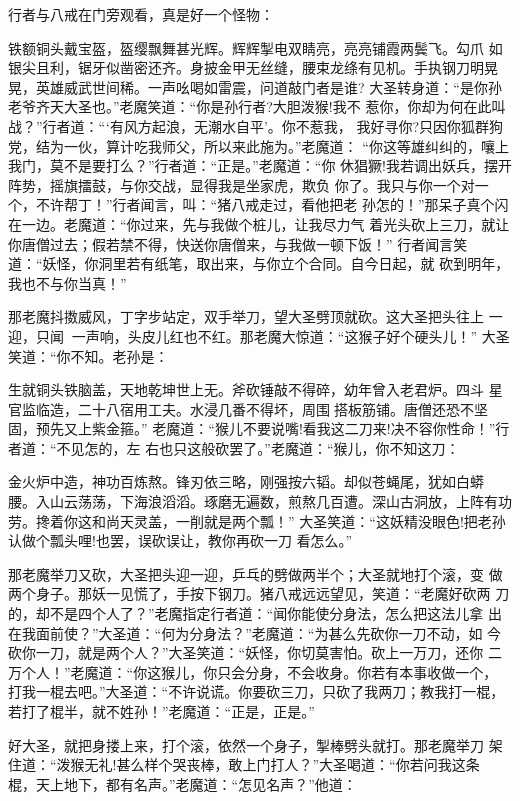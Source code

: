 行者与八戒在门旁观看，真是好一个怪物：

铁额铜头戴宝盔，盔缨飘舞甚光辉。辉辉掣电双睛亮，亮亮铺霞两鬓飞。勾爪
如银尖且利，锯牙似凿密还齐。身披金甲无丝缝，腰束龙绦有见机。手执钢刀明晃
晃，英雄威武世间稀。一声吆喝如雷震，问道敲门者是谁?
大圣转身道：“是你孙老爷齐天大圣也。”老魔笑道：“你是孙行者?大胆泼猴!我不
惹你，你却为何在此叫战？”行者道：“‘有风方起浪，无潮水自平’。你不惹我，
我好寻你?只因你狐群狗党，结为一伙，算计吃我师父，所以来此施为。”老魔道：
“你这等雄纠纠的，嚷上我门，莫不是要打么？”行者道：“正是。”老魔道：“你
休猖獗!我若调出妖兵，摆开阵势，摇旗擂鼓，与你交战，显得我是坐家虎，欺负
你了。我只与你一个对一个，不许帮丁！”行者闻言，叫：“猪八戒走过，看他把老
孙怎的！”那呆子真个闪在一边。老魔道：“你过来，先与我做个桩儿，让我尽力气
着光头砍上三刀，就让你唐僧过去；假若禁不得，快送你唐僧来，与我做一顿下饭！”
行者闻言笑道：“妖怪，你洞里若有纸笔，取出来，与你立个合同。自今日起，就
砍到明年，我也不与你当真！”

那老魔抖擞威风，丁字步站定，双手举刀，望大圣劈顶就砍。这大圣把头往上
一迎，只闻一声响，头皮儿红也不红。那老魔大惊道：“这猴子好个硬头儿！”
大圣笑道：“你不知。老孙是：

生就铜头铁脑盖，天地乾坤世上无。斧砍锤敲不得碎，幼年曾入老君炉。四斗
星官监临造，二十八宿用工夫。水浸几番不得坏，周围搭板筋铺。唐僧还恐不坚
固，预先又上紫金箍。”
老魔道：“猴儿不要说嘴!看我这二刀来!决不容你性命！”行者道：“不见怎的，左
右也只这般砍罢了。”老魔道：“猴儿，你不知这刀：

金火炉中造，神功百炼熬。锋刃依三略，刚强按六韬。却似苍蝇尾，犹如白蟒
腰。入山云荡荡，下海浪滔滔。琢磨无遍数，煎熬几百遭。深山古洞放，上阵有功
劳。搀着你这和尚天灵盖，一削就是两个瓢！”
大圣笑道：“这妖精没眼色!把老孙认做个瓢头哩!也罢，误砍误让，教你再砍一刀
看怎么。”

那老魔举刀又砍，大圣把头迎一迎，乒乓的劈做两半个；大圣就地打个滚，变
做两个身子。那妖一见慌了，手按下钢刀。猪八戒远远望见，笑道：“老魔好砍两
刀的，却不是四个人了？”老魔指定行者道：“闻你能使分身法，怎么把这法儿拿
出在我面前使？”大圣道：“何为分身法？”老魔道：“为甚么先砍你一刀不动，如
今砍你一刀，就是两个人？”大圣笑道：“妖怪，你切莫害怕。砍上一万刀，还你
二万个人！”老魔道：“你这猴儿，你只会分身，不会收身。你若有本事收做一个，
打我一棍去吧。”大圣道：“不许说谎。你要砍三刀，只砍了我两刀；教我打一棍，
若打了棍半，就不姓孙！”老魔道：“正是，正是。”

好大圣，就把身搂上来，打个滚，依然一个身子，掣棒劈头就打。那老魔举刀
架住道：“泼猴无礼!甚么样个哭丧棒，敢上门打人？”大圣喝道：“你若问我这条
棍，天上地下，都有名声。”老魔道：“怎见名声？”他道：

